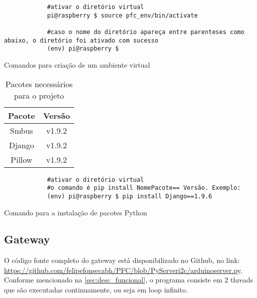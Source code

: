 		\begin{listing}[!htb]
			\begin{verbatim}
			#ativar o diretório virtual
			pi@raspberry $ source pfc_env/bin/activate
			
			#caso o nome do diretório apareça entre parenteses como abaixo, o diretório foi ativado com sucesso
			(env) pi@raspberry $ 		
			\end{verbatim}
			\caption{Comandos para criação de um ambiente virtual}
			\label{cod:activate_venv}
		\end{listing}
		
		
		\begin{table}[!htb]
			\centering
			\caption{Pacotes necessários para o projeto}
			\label{tbl6}
			\def\arraystretch{1.3}
			\begin{tabular}{c c}
				\hline
				\multicolumn{1}{c}{\textbf{Pacote}} & \multicolumn{1}{c}{\textbf{Versão}} \\ \hline
				
				Smbus & v1.9.2 \\
				Django & v1.9.2 \\ %
				Pillow & v1.9.2 \\ %
				\hline
			\end{tabular}
		\end{table}
		
		\begin{listing}[!htb]
			\begin{verbatim}
			#ativar o diretório virtual
			#o comando é pip install NomePacote== Versão. Exemplo:
			(env) pi@raspberry $ pip install Django==1.9.6					
			\end{verbatim}
			\caption{Comando para a instalação de pacotes Python}
			\label{cod:install}
		\end{listing}
		
	\subsection{Gateway}
		O código fonte completo do gateway está disponibilizado no Github, no link: \url{https://github.com/felipefonsecabh/PFC/blob/PyServeri2c/arduinoserver.py}. Conforme mencionado na \autoref{sec:desc_funcional}, o programa consiste em 2 threads que são executadas continuamente, ou seja em loop infinito.
		
